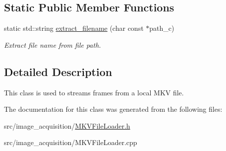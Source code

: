 \subsection*{Static Public Member Functions}
\begin{DoxyCompactItemize}
\item 
\mbox{\label{classimage__acquisition_1_1_m_k_v_file_loader_ad4d75f803383c13791ccb01d8b6b5349}} 
static std\+::string \mbox{\hyperlink{classimage__acquisition_1_1_m_k_v_file_loader_ad4d75f803383c13791ccb01d8b6b5349}{extract\+\_\+filename}} (char const $\ast$path\+\_\+c)
\begin{DoxyCompactList}\small\item\em Extract file name from file path. \end{DoxyCompactList}\end{DoxyCompactItemize}


\subsection{Detailed Description}
This class is used to streams frames from a local M\+KV file. 

The documentation for this class was generated from the following files\+:\begin{DoxyCompactItemize}
\item 
src/image\+\_\+acquisition/\mbox{\hyperlink{_m_k_v_file_loader_8h}{M\+K\+V\+File\+Loader.\+h}}\item 
src/image\+\_\+acquisition/M\+K\+V\+File\+Loader.\+cpp\end{DoxyCompactItemize}
